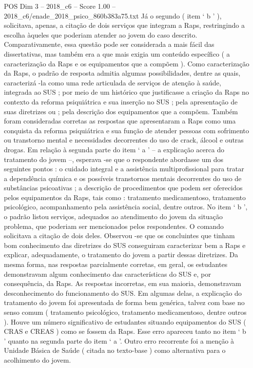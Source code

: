 \begin{textsample}{POS Dim 3 – 2018\_c6 – Score 1.00 – 2018\_c6/enade\_2018\_psico\_860b383a75.txt}
Já o segundo ( item ‘ b ’ ), solicitava, apenas, a citação de dois serviços que integram a Raps, restringindo a escolha àqueles que poderiam atender ao jovem do caso descrito.
Comparativamente, essa questão pode ser considerada a mais fácil das dissertativas, mas também era a que mais exigia um conteúdo específico ( a caracterização da Raps e os equipamentos que a compõem ).
Como caracterização da Raps, o padrão de resposta admitia algumas possibilidades, dentre as quais, caracterizá -la como uma rede articulada de serviços de atenção à saúde, integrada ao SUS ; por meio de um histórico que justificasse a criação da Raps no contexto da reforma psiquiátrica e sua inserção no SUS ; pela apresentação de suas diretrizes ou ; pela descrição dos equipamentos que a compõem.
Também foram consideradas corretas as respostas que apresentaram a Raps como uma conquista da reforma psiquiátrica e sua função de atender pessoas com sofrimento ou transtorno mental e necessidades decorrentes do uso de crack, álcool e outras drogas.
Em relação à segunda parte do item ‘ a ’ – a explicação acerca do tratamento do jovem –, esperava -se que o respondente abordasse um dos seguintes pontos : o cuidado integral e a assistência multiprofissional para tratar a dependência química e os possíveis transtornos mentais decorrentes do uso de substâncias psicoativas ; a descrição de procedimentos que podem ser oferecidos pelos equipamentos da Raps, tais como : tratamento medicamentoso, tratamento psicológico, acompanhamento pela assistência social, dentre outros.
No item ‘ b ’, o padrão listou serviços, adequados ao atendimento do jovem da situação problema, que poderiam ser mencionados pelos respondentes.
O comando solicitava a citação de dois deles.
Observou -se que os concluintes que tinham bom conhecimento das diretrizes do SUS conseguiram caracterizar bem a Raps e explicar, adequadamente, o tratamento do jovem a partir dessas diretrizes.
Da mesma forma, nas respostas parcialmente corretas, em geral, os estudantes demonstravam algum conhecimento das características do SUS e, por consequência, da Raps.
As respostas incorretas, em sua maioria, demonstravam desconhecimento do funcionamento do SUS.
Em algumas delas, a explicação do tratamento do jovem foi apresentada de forma bem genérica, talvez com base no senso comum ( tratamento psicológico, tratamento medicamentoso, dentre outros ).
Houve um número significativo de estudantes situando equipamentos do SUS ( CRAS e CREAS ) como se fossem da Raps.
Esse erro apareceu tanto no item ‘ b ’ quanto na segunda parte do item ‘ a ’.
Outro erro recorrente foi a menção à Unidade Básica de Saúde ( citada no texto-base ) como alternativa para o acolhimento do jovem.

\end{textsample}

